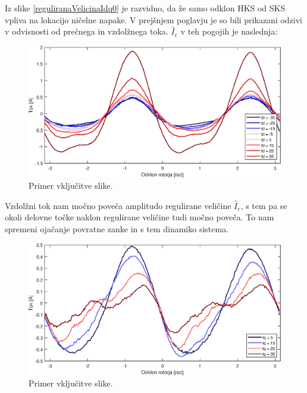 \documentclass[a4paper,twoside,openright,12pt,slovene]{book}
\begin{document}
Iz slike \ref{reguliranaVelicinaIdq0} je razvidno, da že samo odklon HKS od SKS vpliva na lokacijo ničelne napake. V prejšnjem poglavju je so bili prikazani odzivi v odvisnosti od prečnega in
vzdolžnega toka. $\hat{I}_{e}$ v teh pogojih je naslednja:

\begin{figure}[!htbp]
    \centering
    \includegraphics[width=1\columnwidth]{Slike/reguliranaVelicinaId.eps}
    \caption{\label{reguliranaVelicinaId} Primer vključitve slike.}
\end{figure}


Vzdolžni tok nam močno poveča amplitudo regulirane veličine $\hat{I}_{e}$, s tem pa se okoli delovne točke naklon regulirane veličine tudi močno poveča. To nam spremeni ojačanje povratne zanke in s
tem dinamiko sistema.

\begin{figure}[!htbp]
    \centering
    \includegraphics[width=01\columnwidth]{Slike/reguliranaVelicinaIq.eps}
    \caption{\label{reguliranaVelicinaIq} Primer vključitve slike.}
\end{figure}
\end{document}
